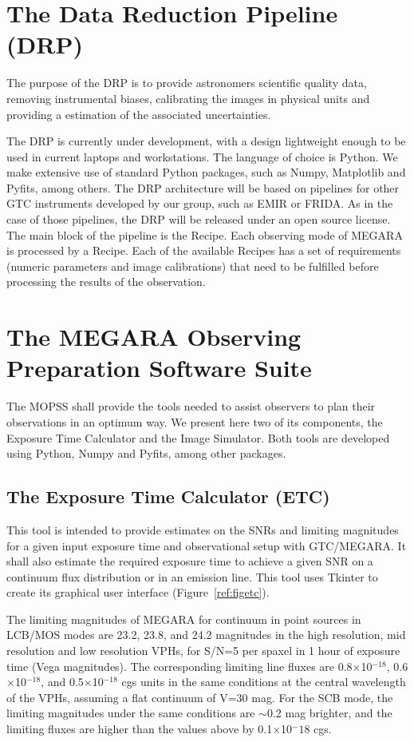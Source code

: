 \documentclass[11pt,twoside]{article}
\begin{document}
\section{The Data Reduction Pipeline (DRP)}
The purpose of the DRP is to provide astronomers scientific quality data,  removing instrumental biases, 
calibrating the images in physical units and providing a estimation of the associated uncertainties.

The DRP is currently under development, with a design lightweight enough to be 
used in current laptops and workstations. The language of choice is Python. We
make extensive use of standard Python packages, such as Numpy, Matplotlib and 
Pyfits, among others. The DRP architecture will be based on 
pipelines for other GTC instruments developed by our group, such as EMIR or 
FRIDA. As in the case of those pipelines, the DRP will be released
under an open source license. The main block of the pipeline is the Recipe. 
Each observing mode of MEGARA is processed by
a Recipe. Each of the available Recipes has a set of requirements 
(numeric parameters and image calibrations) that need to be fulfilled 
before processing the results of the observation. 

\section{The MEGARA Observing Preparation Software Suite}
The MOPSS shall provide the tools needed to assist observers to plan their observations in an optimum way. We present here two of its components, the Exposure Time Calculator and the Image Simulator. Both tools are developed using Python, Numpy and Pyfits, among other packages.

\subsection{The Exposure Time Calculator (ETC)}

This tool is intended to provide estimates on the SNRs and limiting magnitudes for a given
input exposure time and observational setup with GTC/MEGARA. It shall also estimate the required exposure time to achieve a given SNR on a continuum flux distribution or in an emission line. This tool uses Tkinter to create its graphical user interface (Figure~\ref{ref:figetc}).


The limiting magnitudes of MEGARA for continuum in point sources in LCB/MOS modes are 23.2, 23.8, and 24.2 magnitudes in the high resolution, mid resolution and low resolution VPHs, for S/N=5 per spaxel in 1 hour of exposure time (Vega magnitudes). The corresponding limiting line fluxes are 
0.8$\times$10$^{-18}$, 0.6$\times$10$^{-18}$, and 0.5$\times$10$^{-18}$ cgs units in the same conditions at the central wavelength of the VPHs, assuming a flat continuum of V=30 mag. For the SCB mode, the limiting magnitudes under the same conditions are $\sim$0.2 mag brighter, and the limiting fluxes are higher than the values above by 0.1$\times$10$^-18$ cgs.
\end{document}
